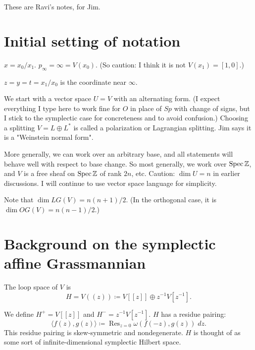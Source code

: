 {\parskip=12pt %



  
  These are Ravi's notes, for Jim.


  \section{Initial setting of notation}

  $\boxed{x} = \boxed{x_0} / \boxed{x_1}$.  $\boxed{p_{\infty}} = \infty = V(x_0)$.
  (So caution: I think it is not $V(x_1)=[1,0]$.)

 $\boxed{z} = y= t = x_1/x_0$ is the coordinate near $\infty$.


We start with a vector space $\boxed{U=V}$ with an alternating form. 
(I expect everything I type here to work fine for $O$ in place of $Sp$  with change of signs, but I stick to the symplectic case for concreteness and to avoid confusion.) 
Choosing a splitting $V = L \oplus L^*$ is called a polarization or Lagrangian splitting. Jim says it is a "Weinstein normal form".

More generally, we can work over an arbitrary base, and all statements will behave well with respect to base change.
So most generally, we work over $\operatorname{Spec} \mathbb{Z}$, and $V$ is a free sheaf on $\operatorname{Spec} \mathbb{Z}$ of rank $\boxed{\boxed{2n}}$, etc.
Caution:  $\dim U=n$ in earlier discussions.
I will continue to use vector space language for simplicity.

Note that $\boxed{\boxed{\dim LG(V)= n(n+1)/2}}$.  (In the orthogonal case, it is $\boxed{\boxed{\dim OG(V)= n(n-1)/2}}$.)


\section{Background on the symplectic affine Grassmannian}



The loop space of $V$ is
$$\boxed{H} = \boxed{V((z))} \coloneq V[[z]] \oplus z^{-1} V[ z^{-1}].$$


We define
$\boxed{H^+} = V[[z]]$ and $\boxed{H^-} = z^{-1} V[ z^{-1}]$.
$H$ has a residue pairing:  
$$\boxed{\langle f(z), g(z) \rangle} \coloneq \operatorname{Res}_{z=0}  \omega(f(-z), g(z)) \; dz.$$
This residue pairing is skew-symmetric and nondegenerate.
$H$ is thought of as some sort of infinite-dimensional symplectic Hilbert space.


}
